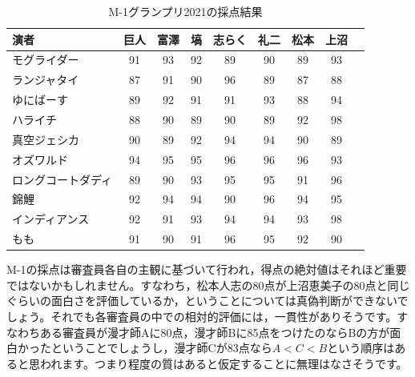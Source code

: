 \documentclass{ltjsbook}
\begin{document}
\begin{table}[ht]
	\centering
	\caption{M-1グランプリ2021の採点結果}
	\begin{tabular}{l|cccccccc}
		\hline
		演者        & 巨人 & 富澤 & 塙  & 志らく & 礼二 & 松本 & 上沼 \\
		\hline
		モグライダー    & 91 & 93 & 92 & 89  & 90 & 89 & 93 \\
		ランジャタイ    & 87 & 91 & 90 & 96  & 89 & 87 & 88 \\
		ゆにばーす     & 89 & 92 & 91 & 91  & 93 & 88 & 94 \\
		ハライチ      & 88 & 90 & 89 & 90  & 89 & 92 & 98 \\
		真空ジェシカ    & 90 & 89 & 92 & 94  & 94 & 90 & 89 \\
		オズワルド     & 94 & 95 & 95 & 96  & 96 & 96 & 93 \\
		ロングコートダディ & 89 & 90 & 93 & 95  & 95 & 91 & 96 \\
		錦鯉        & 92 & 94 & 94 & 90  & 96 & 94 & 95 \\
		インディアンス   & 92 & 91 & 93 & 94  & 94 & 93 & 98 \\
		もも        & 91 & 90 & 91 & 96  & 95 & 92 & 90 \\
		\hline
	\end{tabular}
	\label{tbl:h15_m1}
\end{table}


M-1の採点は審査員各自の主観に基づいて行われ，得点の絶対値はそれほど重要ではないかもしれません。すなわち，松本人志の80点が上沼恵美子の80点と同じぐらいの面白さを評価しているか，ということについては真偽判断ができないでしょう。それでも各審査員の中での相対的評価には，一貫性がありそうです。すなわちある審査員が漫才師Aに80点，漫才師Bに85点をつけたのならBの方が面白かったということでしょうし，漫才師Cが83点なら$A<C<B$という順序はあると思われます。つまり程度の質はあると仮定することに無理はなさそうです。
\end{document}
